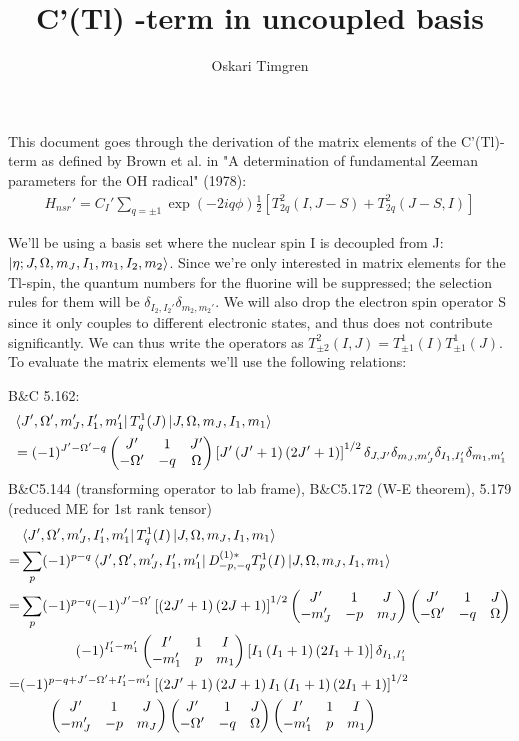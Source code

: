 \documentclass{article}
\title{C'(Tl) -term in uncoupled basis}
\author{Oskari Timgren}
\numberwithin{equation}{section}
\numberwithin{table}{section}
\newcommand{\tj}[6]{ \begin{pmatrix}
   #1 & #2 & #3 \\
   #4 & #5 & #6 
  \end{pmatrix}}
\begin{document}
	\maketitle
	\doublespacing

This document goes through the derivation of the matrix elements of the C'(Tl)-term as defined by Brown et al. in "A determination of fundamental Zeeman parameters for the OH radical" (1978):
\begin{align}
	H_{nsr}' = C_I' \sum_{q = \pm1} \exp(-2iq\phi) \frac{1}{2} \left[T^2_{2q}(I, J-S) + T^2_{2q}(J-S,I)\right] 
\end{align} 

We'll be using a basis set where the nuclear spin I is decoupled from J: $ \ket{\eta; J,\Omega, m_J, I_1, m_1, I_2, m_2} $. Since we're only interested in matrix elements for the Tl-spin, the quantum numbers for the fluorine will be suppressed; the selection rules for them will be $ \delta_{I_2, I_2'} \delta_{m_2, m_2'} $. We will also drop the electron spin operator S since it only couples to different electronic states, and thus does not contribute significantly. We can thus write the operators as $ T^2_{\pm2}(I, J) = T^1_{\pm1}(I)T^1_{\pm1}(J) $. To evaluate the matrix elements we'll use the following relations:

\begin{outline}
	\1 B\&C 5.162:
	\begin{align}
		&\bra{J',\Omega', m_J', I_1', m_1'}T^1_q(J)\ket{J,\Omega, m_J, I_1, m_1} \\
		& = (-1)^{J'-\Omega'-q} \tj{J'}{1}{J'}{-\Omega'}{-q}{\Omega} \left[J'\left(J'+1\right)\left(2J'+1\right)\right]^{1/2} \delta_{J,J'} \delta_{m_J,m_J'} \delta_{I_1, I_1'} \delta_{m_1, m_1'}
	\end{align}
	\1 B\&C5.144 (transforming operator to lab frame),  B\&C5.172 (W-E theorem), 5.179 (reduced ME for 1st rank tensor)
	\begin{align}
		&\bra{J',\Omega', m_J', I_1', m_1'}T^1_q(I)\ket{J,\Omega, m_J, I_1, m_1} \\
		=& \sum_p (-1)^{p-q}\bra{J',\Omega', m_J', I_1', m_1'}\mathit{D}^{(1)*}_{-p,-q}T^1_p(I)\ket{J,\Omega, m_J, I_1, m_1} \\
		=& \sum_p (-1)^{p-q} (-1)^{J'-\Omega'} \left[\left(2J'+1\right)\left(2J+1\right)\right]^{1/2} \tj{J'}{1}{J}{-m_J'}{-p}{m_J} \tj{J'}{1}{J}{-\Omega'}{-q}{\Omega} \\
		&\qquad\qquad(-1)^{I_1'-m_1'} \tj{I'}{1}{I}{-m'_1}{p}{m_1}\left[I_1\left(I_1+1\right)\left(2I_1+1\right)  \right]\delta_{I_1, I_1'} \\
		=&  (-1)^{p-q+J'-\Omega'+I_1'-m_1'} \left[\left(2J'+1\right)\left(2J+1\right)I_1\left(I_1+1\right)\left(2I_1+1\right)\right]^{1/2} \\
		&\qquad \tj{J'}{1}{J}{-m_J'}{-p}{m_J} \tj{J'}{1}{J}{-\Omega'}{-q}{\Omega} \tj{I'}{1}{I}{-m'_1}{p}{m_1}
	\end{align}
\end{outline}
\end{document}
